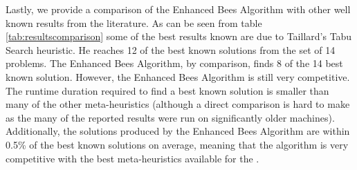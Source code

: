 Lastly, we provide a comparison of the Enhanced Bees Algorithm with other well known results from the literature. As can be seen from table \ref{tab:resultscomparison} some of the best results known are due to Taillard's Tabu Search heuristic. He reaches 12 of the best known solutions from the set of 14 problems. The Enhanced Bees Algorithm, by comparison, finds 8 of the 14 best known solution. However, the Enhanced Bees Algorithm is still very competitive. The runtime duration required to find a best known solution is smaller than many of the other meta-heuristics (although a direct comparison is hard to make as the many of the reported results were run on significantly older machines). Additionally, the solutions produced by the Enhanced Bees Algorithm are within 0.5\% of the best known solutions on average, meaning that the algorithm is very competitive with the best meta-heuristics available for the \VRP.

